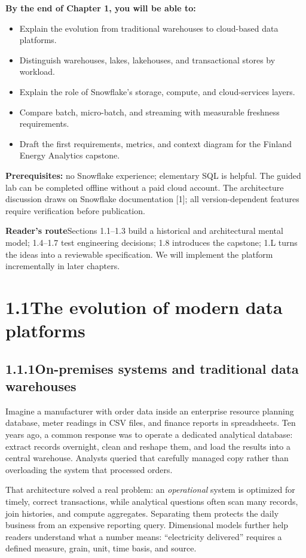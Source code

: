 \documentclass[11pt,twoside]{article}
\newcommand{\topic}[2]{\subsection*{#1\quad #2}}
\begin{document}
\textbf{By the end of Chapter 1, you will be able to:}
\begin{itemize}
\item Explain the evolution from traditional warehouses to cloud-based data platforms.
\item Distinguish warehouses, lakes, lakehouses, and transactional stores by workload.
\item Explain the role of Snowflake's storage, compute, and cloud-services layers.
\item Compare batch, micro-batch, and streaming with measurable freshness requirements.
\item Draft the first requirements, metrics, and context diagram for the Finland Energy Analytics capstone.
\end{itemize}
\textbf{Prerequisites:} no Snowflake experience; elementary SQL is helpful. The guided lab can be completed offline without a paid cloud account. The architecture discussion draws on Snowflake documentation [1]; all version-dependent features require verification before publication.
\begin{whitebox}
\textbf{Reader's route}\quad Sections 1.1--1.3 build a historical and architectural mental model; 1.4--1.7 test engineering decisions; 1.8 introduces the capstone; 1.L turns the ideas into a reviewable specification. We will implement the platform incrementally in later chapters.
\end{whitebox}

\section*{1.1\quad The evolution of modern data platforms}
\topic{1.1.1}{On-premises systems and traditional data warehouses}
Imagine a manufacturer with order data inside an enterprise resource planning database, meter readings in CSV files, and finance reports in spreadsheets. Ten years ago, a common response was to operate a dedicated analytical database: extract records overnight, clean and reshape them, and load the results into a central warehouse. Analysts queried that carefully managed copy rather than overloading the system that processed orders.

That architecture solved a real problem: an \emph{operational} system is optimized for timely, correct transactions, while analytical questions often scan many records, join histories, and compute aggregates. Separating them protects the daily business from an expensive reporting query. Dimensional models further help readers understand what a number means: ``electricity delivered'' requires a defined measure, grain, unit, time basis, and source.
\end{document}
